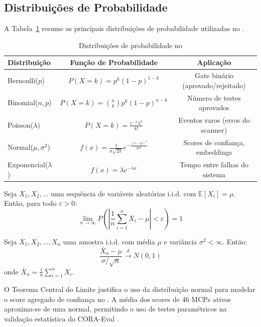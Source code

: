 \subsection{Distribuições de Probabilidade}
A Tabela~\ref{tab:distribuicoes} resume as principais distribuições de
probabilidade utilizadas no \opencodeeco{}.
\begin{table}[htb]
\centering
\caption{Distribuições de probabilidade no \opencodeeco{}}
\label{tab:distribuicoes}
\begin{tabular}{lcc}
\toprule
\textbf{Distribuição} & \textbf{Função de Probabilidade} &
\textbf{Aplicação} \\
\midrule
Bernoulli($p$) & $P(X = k) = p^k(1-p)^{1-k}$ &
Gate binário (aprovado/rejeitado) \\
Binomial($n, p$) & $P(X = k) = \binom{n}{k}p^k(1-p)^{n-k}$ &
Número de testes aprovados \\
Poisson($\lambda$) & $P(X = k) = \frac{e^{-\lambda}\lambda^k}{k!}$ &
Eventos raros (erros do scanner) \\
Normal($\mu, \sigma^2$) & $f(x) = \frac{1}{\sigma\sqrt{2\pi}}
e^{-\frac{(x-\mu)^2}{2\sigma^2}}$ &
Scores de confiança, embeddings \\
Exponencial($\lambda$) & $f(x) = \lambda e^{-\lambda x}$ &
Tempo entre falhas do sistema \\
\bottomrule
\end{tabular}
\end{table}
\begin{teorema}
Seja $X_1, X_2, \ldots$ uma sequência de variáveis aleatórias i.i.d.
com $\mathbb{E}[X_i] = \mu$. Então, para todo $\varepsilon > 0$:
\[\lim_{n \to \infty} P\left(\left|\frac{1}{n}\sum_{i=1}^n X_i - \mu\right|
< \varepsilon\right) = 1
\]
\end{teorema}
\begin{teorema}
Seja $X_1, X_2, \ldots, X_n$ uma amostra i.i.d. com média $\mu$ e
variância $\sigma^2 < \infty$. Então:
\[\frac{\bar{X}_n - \mu}{\sigma / \sqrt{n}} \xrightarrow{d} N(0, 1)
\]
onde $\bar{X}_n = \frac{1}{n}\sum_{i=1}^n X_i$.
\end{teorema}
\begin{exemplo}
O Teorema Central do Limite justifica o uso da distribuição normal para
modelar o score agregado de confiança no \opencodeeco{}. A média dos
scores de 46 MCPs ativos aproxima-se de uma normal, permitindo o uso de
testes paramétricos na validação estatística do CORA-Eval
\cite{laranjeira2026cora}.
\end{exemplo}
